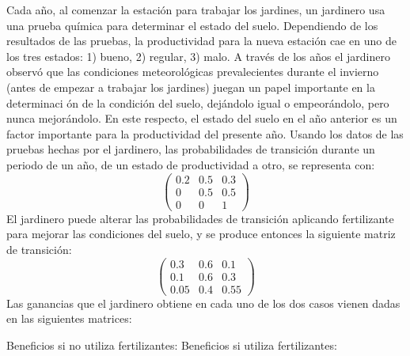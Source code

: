 \documentclass[twoside]{article}
\begin{document}
\newpage 
\begin{ejercicio}{2}
Cada año, al comenzar la estación para trabajar los jardines, un jardinero usa una prueba
química para determinar el estado del suelo. Dependiendo de los resultados de las pruebas, la
productividad para la nueva estación cae en uno de los tres estados: 1) bueno, 2) regular, 3) malo.
A través de los años el jardinero observó que las condiciones meteorológicas prevalecientes durante
el invierno (antes de empezar a trabajar los jardines) juegan un papel importante en la determinaci
ón de la condición del suelo, dejándolo igual o empeorándolo, pero nunca mejorándolo. En
este respecto, el estado del suelo en el año anterior es un factor importante para la productividad
del presente año. Usando los datos de las pruebas hechas por el jardinero, las probabilidades de
transición durante un periodo de un año, de un estado de productividad a otro, se representa con:
\[
\begin{pmatrix}
0. 2 & 0. 5 & 0. 3\\
0 & 0.5 & 0.5\\
0 & 0 & 1
\end{pmatrix}
\]
El jardinero puede alterar las probabilidades de transición aplicando fertilizante para mejorar las
condiciones del suelo, y se produce entonces la siguiente matriz de transición:
\[
\begin{pmatrix}
0.3 & 0.6 & 0.1\\
0.1 & 0.6 & 0.3\\
0.05 & 0.4 & 0.55
\end{pmatrix}
\]
Las ganancias que el jardinero obtiene en cada uno de los dos casos vienen dadas en las siguientes
matrices:

Beneficios si no utiliza fertilizantes: \hskip3cm Beneficios si utiliza fertilizantes:


\end{ejercicio}
\end{document}
